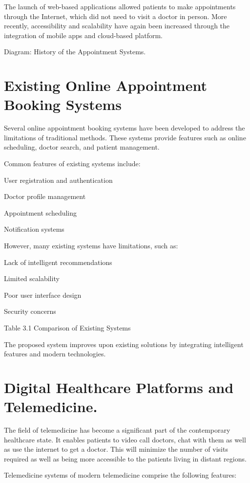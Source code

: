 The launch of web-based applications allowed patients to make appointments through the Internet, which did not need to visit a doctor in person. More recently, accessibility and scalability have again been increased through the integration of mobile apps and cloud-based platform.

Diagram: History of the Appointment Systems.

\section{Existing Online Appointment Booking Systems}

Several online appointment booking systems have been developed to address the limitations of traditional methods. These systems provide features such as online scheduling, doctor search, and patient management.

Common features of existing systems include:

User registration and authentication

Doctor profile management

Appointment scheduling

Notification systems

However, many existing systems have limitations, such as:

Lack of intelligent recommendations

Limited scalability

Poor user interface design

Security concerns

Table 3.1 Comparison of Existing Systems

The proposed system improves upon existing solutions by integrating intelligent features and modern technologies.

\section{Digital Healthcare Platforms and Telemedicine.}

The field of telemedicine has become a significant part of the contemporary healthcare state. It enables patients to video call doctors, chat with them as well as use the internet to get a doctor. This will minimize the number of visits required as well as being more accessible to the patients living in distant regions.

Telemedicine systems of modern telemedicine comprise the following features:

